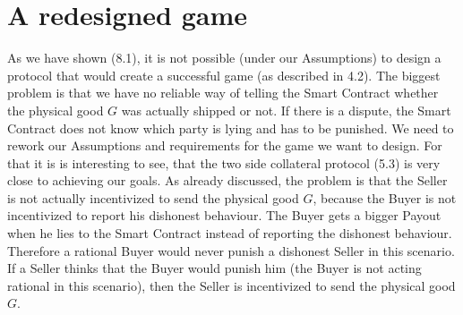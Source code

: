 \documentclass{cacthesis}
\begin{document}
\chapter{A redesigned game}
As we have shown (8.1), it is not possible (under our Assumptions) to design a protocol that would create a successful game (as described in 4.2). The biggest problem is that we have no reliable way of telling the Smart Contract whether the physical good $G$ was actually shipped or not. If there is a dispute, the Smart Contract does not know which party is lying and has to be punished.\newline
We need to rework our Assumptions and requirements for the game we want to design. For that it is is interesting to see, that the two side collateral protocol (5.3) is very close to achieving our goals. As already discussed, the problem is that the Seller is not actually incentivized to send the physical good $G$, because the Buyer is not incentivized to report his dishonest behaviour. The Buyer gets a bigger Payout when he lies to the Smart Contract instead of reporting the dishonest behaviour. Therefore a rational Buyer would never punish a dishonest Seller in this scenario. If a Seller thinks that the Buyer would punish him (the Buyer is not acting rational in this scenario), then the Seller is incentivized to send the physical good $G$.\newline
{}
\end{document}
